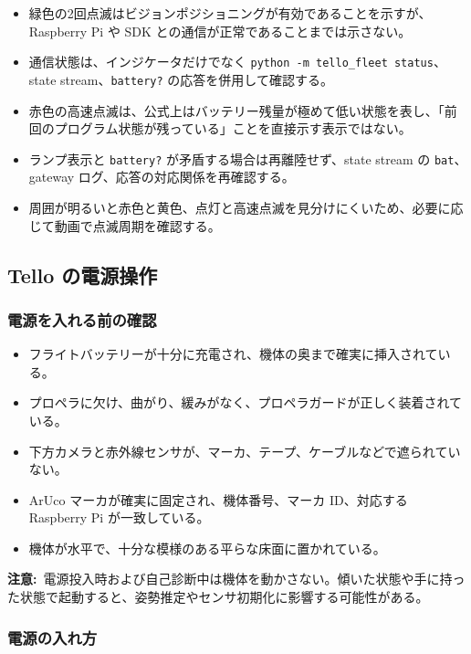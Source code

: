 \documentclass[11pt,a4paper]{ltjsarticle}
\newcommand{\code}[1]{\texttt{\small #1}}
\newcommand{\warning}[1]{\par\smallskip\noindent\textbf{注意:}~#1\par\smallskip}
\begin{document}
\begin{itemize}[leftmargin=1.4em]
  \item 緑色の2回点滅はビジョンポジショニングが有効であることを示すが、Raspberry Pi や SDK との通信が正常であることまでは示さない。
  \item 通信状態は、インジケータだけでなく \code{python -m tello\_fleet status}、state stream、\code{battery?} の応答を併用して確認する。
  \item 赤色の高速点滅は、公式上はバッテリー残量が極めて低い状態を表し、「前回のプログラム状態が残っている」ことを直接示す表示ではない。
  \item ランプ表示と \code{battery?} が矛盾する場合は再離陸せず、state stream の \code{bat}、gateway ログ、応答の対応関係を再確認する。
  \item 周囲が明るいと赤色と黄色、点灯と高速点滅を見分けにくいため、必要に応じて動画で点滅周期を確認する。
\end{itemize}

\subsection{Tello の電源操作}
\label{subsec:tello_power}

\subsubsection{電源を入れる前の確認}

\begin{itemize}[leftmargin=1.4em]
  \item フライトバッテリーが十分に充電され、機体の奥まで確実に挿入されている。
  \item プロペラに欠け、曲がり、緩みがなく、プロペラガードが正しく装着されている。
  \item 下方カメラと赤外線センサが、マーカ、テープ、ケーブルなどで遮られていない。
  \item ArUco マーカが確実に固定され、機体番号、マーカ ID、対応する Raspberry Pi が一致している。
  \item 機体が水平で、十分な模様のある平らな床面に置かれている。
\end{itemize}

\warning{電源投入時および自己診断中は機体を動かさない。傾いた状態や手に持った状態で起動すると、姿勢推定やセンサ初期化に影響する可能性がある。}

\subsubsection{電源の入れ方}
\end{document}
